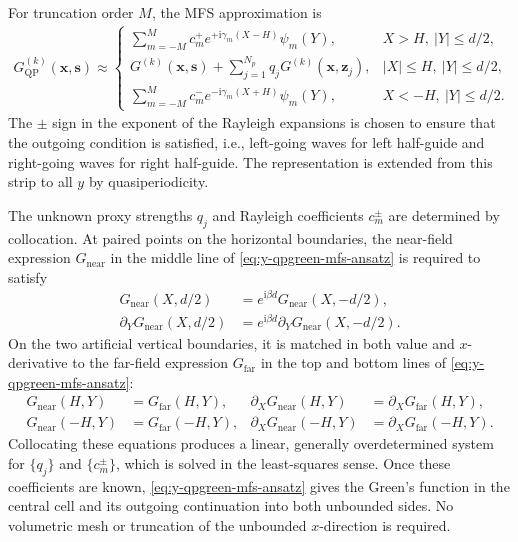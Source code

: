 \documentclass[11pt,fleqn]{article}
\newcommand{\ii}{\mathrm{i}}
\theoremstyle{definition}
\theoremstyle{remark}
\begin{document}
For truncation order
$M$, the MFS approximation is
\begin{align}
  G_{\mathrm{QP}}^{(k)}(\mathbf{x},\mathbf{s})\approx
  \begin{cases}
    \displaystyle
    \sum_{m=-M}^{M}c_m^+
    e^{+\ii\gamma_m(X-H)}\psi_m(Y),
    & X>H,\ |Y|\leq d/2,\\[0.6em]
    \displaystyle
    G^{(k)}(\mathbf{x},\mathbf{s})
    +\sum_{j=1}^{N_p}q_jG^{(k)}(\mathbf{x},\mathbf{z}_j),
    & |X|\leq H,\ |Y|\leq d/2,\\[0.6em]
    \displaystyle
    \sum_{m=-M}^{M}c_m^-
    e^{-\ii\gamma_m(X+H)}\psi_m(Y),
    & X<-H,\ |Y|\leq d/2.
  \end{cases}
  \label{eq:y-qpgreen-mfs-ansatz}
\end{align}
The $\pm$ sign in the exponent of the Rayleigh expansions is chosen to ensure that the outgoing condition is satisfied, i.e., left-going waves for left half-guide and right-going waves for right half-guide.
The representation is extended from this strip to all $y$ by quasiperiodicity.

The unknown proxy strengths $q_j$ and Rayleigh coefficients $c_m^\pm$
are determined by collocation. At paired points on the horizontal boundaries,
the near-field expression $G_{\mathrm{near}}$ in the middle line of
\eqref{eq:y-qpgreen-mfs-ansatz} is required to satisfy
\begin{align}
  G_{\mathrm{near}}(X,d/2)
  &=e^{\ii\beta d}G_{\mathrm{near}}(X,-d/2),\\
  \partial_YG_{\mathrm{near}}(X,d/2)
  &=e^{\ii\beta d}\partial_YG_{\mathrm{near}}(X,-d/2).
\end{align}
On the two artificial vertical boundaries, it is matched in both value and
$x$-derivative to the far-field expression $G_{\mathrm{far}}$ in the top and bottom lines of \eqref{eq:y-qpgreen-mfs-ansatz}:
\begin{align}
  G_{\mathrm{near}}(H,Y)&=G_{\mathrm{far}}(H,Y),&
  \partial_XG_{\mathrm{near}}(H,Y)&=\partial_XG_{\mathrm{far}}(H,Y),\\
  G_{\mathrm{near}}(-H,Y)&=G_{\mathrm{far}}(-H,Y),&
  \partial_XG_{\mathrm{near}}(-H,Y)&=\partial_XG_{\mathrm{far}}(-H,Y).
\end{align}
Collocating these equations produces a linear, generally overdetermined system
for $\{q_j\}$ and $\{c_m^\pm\}$, which is solved in the least-squares sense.
Once these coefficients are known, \eqref{eq:y-qpgreen-mfs-ansatz} gives the
Green's function in the central cell and its outgoing continuation into both
unbounded sides. No volumetric mesh or truncation of the unbounded
$x$-direction is required.
\end{document}
